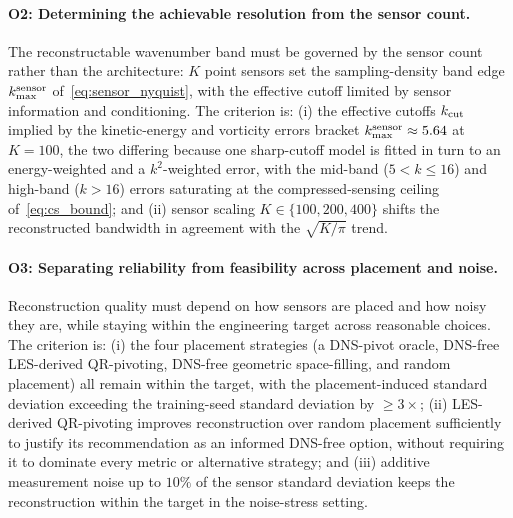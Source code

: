\paragraph{O2: Determining the achievable resolution from the sensor count.}
The reconstructable wavenumber band must be governed by the sensor count rather than the architecture: $K$ point sensors set the sampling-density band edge $k_{\max}^{\rm sensor}$ of~\eqref{eq:sensor_nyquist}, with the effective cutoff limited by sensor information and conditioning. The criterion is: (i) the effective cutoffs $k_{\rm cut}$ implied by the kinetic-energy and vorticity errors bracket $k_{\max}^{\rm sensor} \approx 5.64$ at $K = 100$, the two differing because one sharp-cutoff model is fitted in turn to an energy-weighted and a $k^2$-weighted error, with the mid-band ($5 < k \le 16$) and high-band ($k > 16$) errors saturating at the compressed-sensing ceiling of~\eqref{eq:cs_bound}; and (ii) sensor scaling $K \in \{100, 200, 400\}$ shifts the reconstructed bandwidth in agreement with the $\sqrt{K/\pi}$ trend.

\paragraph{O3: Separating reliability from feasibility across placement and noise.}
Reconstruction quality must depend on how sensors are placed and how noisy they are, while staying within the engineering target across reasonable choices. The criterion is: (i) the four placement strategies (a DNS-pivot oracle, DNS-free LES-derived QR-pivoting, DNS-free geometric space-filling, and random placement) all remain within the target, with the placement-induced standard deviation exceeding the training-seed standard deviation by $\ge 3\times$; (ii) LES-derived QR-pivoting improves reconstruction over random placement sufficiently to justify its recommendation as an informed DNS-free option, without requiring it to dominate every metric or alternative strategy; and (iii) additive measurement noise up to $10\%$ of the sensor standard deviation keeps the reconstruction within the target in the noise-stress setting.


